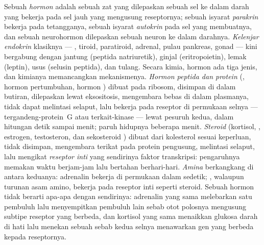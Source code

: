 \begin{definition}[Hormon]\label{def:b3:endocrinology:hormone}
%
Sebuah \emph{hormon} adalah sebuah zat yang dilepaskan sebuah sel ke dalam darah
yang bekerja pada sel jauh yang mengusung reseptornya; sebuah isyarat \emph{parakrin}
bekerja pada tetangganya, sebuah isyarat \emph{autokrin} pada sel yang
membuatnya, dan sebuah neurohormon dilepaskan sebuah neuron ke dalam darahnya.
\emph{Kelenjar endokrin} klasiknya --- , tiroid,
paratiroid, adrenal, pulau pankreas, gonad --- kini bergabung
dengan jantung (peptida natriuretik), ginjal (eritropoietin), lemak
(leptin), usus (selusin peptida), dan tulang. Secara kimia, hormon ada
tiga jenis, dan kimianya memancangkan mekanismenya. \emph{Hormon peptida
dan protein} (, hormon pertumbuhan, hormon
) dibuat pada ribosom, disimpan di dalam butiran, dilepaskan lewat
eksositosis, mengembara bebas di dalam plasmanya, tidak dapat melintasi selaput, lalu bekerja pada
reseptor di permukaan selnya --- tergandeng-protein~G atau terkait-kinase ---
lewat pesuruh kedua, dalam hitungan detik sampai menit; paruh hidupnya
beberapa menit. \emph{Steroid} (kortisol, , estrogen,
testosteron, dan sekosteroid ) dibuat dari kolesterol
sesuai keperluan, tidak disimpan, mengembara terikat pada protein pengusung, melintasi
selaput, lalu mengikat \emph{reseptor inti} yang sendirinya
faktor transkripsi: pengaruhnya memakan waktu berjam-jam lalu bertahan berhari-hari.
\emph{Amina} berkangkang di antara keduanya: adrenalin bekerja di permukaan dalam
sedetik; , walaupun turunan asam amino, bekerja pada
reseptor inti seperti steroid. Sebuah hormon tidak berarti apa-apa dengan sendirinya:
adrenalin yang sama melebarkan satu pembuluh lalu menyempitkan pembuluh lain sebab
otot polosnya mengusung subtipe reseptor yang berbeda, dan kortisol yang sama
menaikkan glukosa darah di hati lalu menekan sebuah  sebab
 kedua selnya menawarkan gen yang berbeda kepada reseptornya.
\end{definition}

